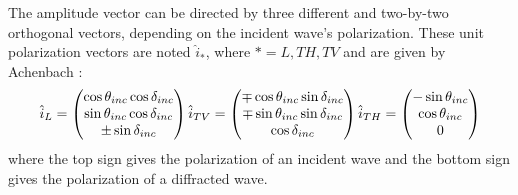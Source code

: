 The amplitude vector can be directed by three different and two-by-two orthogonal vectors, depending on the incident wave's polarization. These unit polarization vectors are noted $\hat{i}_*$, where $*=L, TH, TV$ and are given by Achenbach \cite{Achenbach} :
\begin{equation}
\hat{i}_L = \begin{pmatrix}
\cos\theta_{inc} \cos \delta_{inc} \\ \sin\theta_{inc} \cos \delta_{inc} \\
\pm \sin \delta_{inc}
\end{pmatrix}
\hfill
\hfill
\hat{i}_{TV} = \begin{pmatrix}
\mp\cos\theta_{inc} \sin \delta_{inc} \\ \mp\sin\theta_{inc} \sin \delta_{inc} \\
\cos \delta_{inc}
\end{pmatrix}
\hfill
\hfill
\hat{i}_{TH} = \begin{pmatrix}
-\sin\theta_{inc} \\ \cos\theta_{inc} \\
0
\end{pmatrix}
\label{C4:ivec}
\end{equation}
where the top sign gives the polarization of an incident wave and the bottom sign gives the polarization of a diffracted wave.

